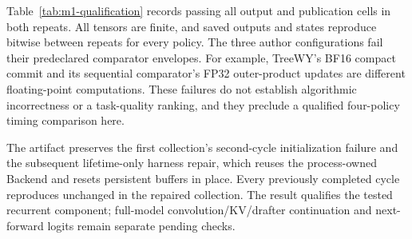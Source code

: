 Table~\ref{tab:m1-qualification} records \sys{} passing all output and publication cells in both repeats. All tensors are finite, and saved outputs and states reproduce bitwise between repeats for every policy. The three author configurations fail their predeclared comparator envelopes. For example, TreeWY's BF16 compact commit and its sequential comparator's FP32 outer-product updates are different floating-point computations. These failures do not establish algorithmic incorrectness or a task-quality ranking, and they preclude a qualified four-policy timing comparison here.

The artifact preserves the first collection's second-cycle initialization failure and the subsequent lifetime-only harness repair, which reuses the process-owned Backend and resets persistent buffers in place. Every previously completed cycle reproduces unchanged in the repaired collection. The result qualifies the tested recurrent component; full-model convolution/KV/drafter continuation and next-forward logits remain separate pending checks.

